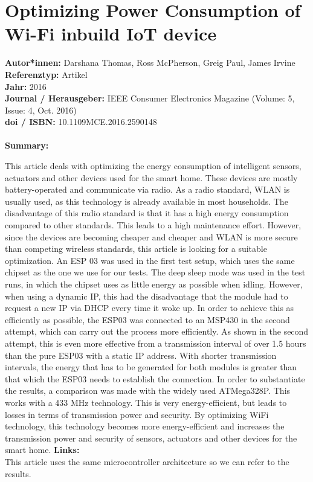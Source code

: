 \documentclass{report}
\begin{document}
{\let\clearpage\relax \chapter{Optimizing Power Consumption of Wi-Fi inbuild IoT device}
\noindent
\textbf{Autor*innen:} Darshana Thomas, Ross McPherson, Greig Paul, James Irvine\\
\textbf{Referenztyp:} Artikel\\
\textbf{Jahr:}  2016\\
\textbf{Journal / Herausgeber:} IEEE Consumer Electronics Magazine (Volume: 5, Issue: 4, Oct. 2016)\\
\textbf{doi / ISBN:} 10.1109\/MCE.2016.2590148\\\\
\textbf{Summary:}\\
{\raggedright
This article deals with optimizing the energy consumption of intelligent sensors, actuators and other devices used for the smart home. These devices are mostly battery-operated and communicate via radio.\linebreak
As a radio standard, WLAN is usually used, as this technology is already available in most households. The disadvantage of this radio standard is that it has a high energy consumption compared to other standards. This leads to a high maintenance effort. However, since the devices are becoming cheaper and cheaper and WLAN is more secure than competing wireless standards, this article is looking for a suitable optimization.\linebreak
An ESP 03 was used in the first test setup, which uses the same chipset as the one we use for our tests.\linebreak
The deep sleep mode was used in the test runs, in which the chipset uses as little energy as possible when idling. However, when using a dynamic IP, this had the disadvantage that the module had to request a new IP via DHCP every time it woke up. In order to achieve this as efficiently as possible, the ESP03 was connected to an MSP430 in the second attempt, which can carry out the process more efficiently. As shown in the second attempt, this is even more effective from a transmission interval of over 1.5 hours than the pure ESP03 with a static IP address. With shorter transmission intervals, the energy that has to be generated for both modules is greater than that which the ESP03 needs to establish the connection. In order to substantiate the results, a comparison was made with the widely used ATMega328P. This works with a 433 MHz technology. This is very energy-efficient, but leads to losses in terms of transmission power and security. By optimizing WiFi technology, this technology becomes more energy-efficient and increases the transmission power and security of sensors, actuators and other devices for the smart home.\linebreak\linebreak
\textbf{Links:}\\
This article uses the same microcontroller architecture so we can refer to the results.}
\pagebreak
	
}
\end{document}
